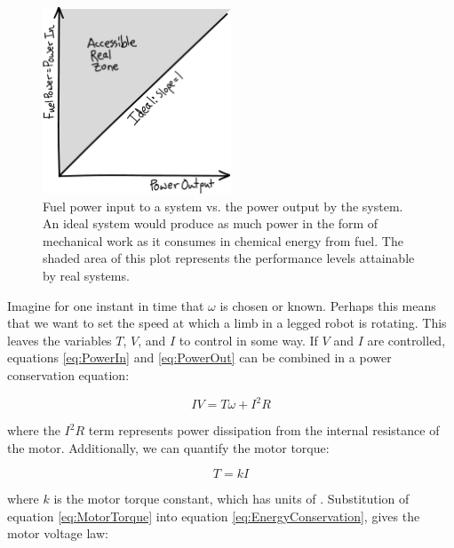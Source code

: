 \begin{figure}[h]		%
\begin{centering}
\includegraphics[width=0.5\textwidth]{Figures/IdealPowerPlotSketch}\par
\end{centering}
\caption[Plot: Power Conservation]{Fuel power input to a system vs. the power output by the system. An ideal system would produce as much power in the form of mechanical work as it consumes in chemical energy from fuel. The shaded area of this plot represents the performance levels attainable by real systems.}
\label{fig:IdealPowerPlotSketch}
\end{figure}

Imagine for one instant in time that $\omega$ is chosen or known. Perhaps this means that we want to set the speed at which a limb in a legged robot is rotating. This leaves the variables $T$, $V$, and $I$ to control in some way. If $V$ and $I$ are controlled, equations \ref{eq:PowerIn} and \ref{eq:PowerOut} can be combined in a power conservation equation:

\begin{equation}
IV = T\omega + I^{2} R
\label{eq:EnergyConservation}
\end{equation}

where the $I^{2}R$ term represents power dissipation from the internal resistance of the motor. Additionally, we can quantify the motor torque:

\begin{equation}
T = kI
\label{eq:MotorTorque}
\end{equation}

where $k$ is the motor torque constant, which has units of . Substitution of equation \ref{eq:MotorTorque} into equation \ref{eq:EnergyConservation}, gives the motor voltage law:


